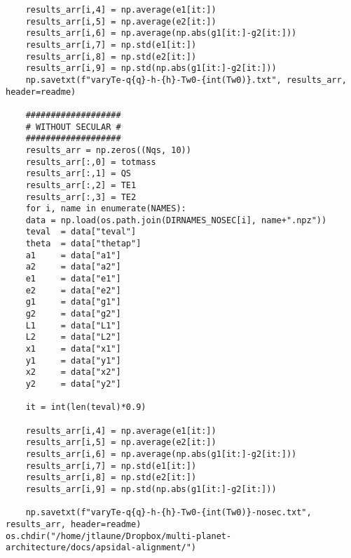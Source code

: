 \documentclass[11pt]{article}
\begin{document}
\begin{verbatim}
	results_arr[i,4] = np.average(e1[it:])
	results_arr[i,5] = np.average(e2[it:])
	results_arr[i,6] = np.average(np.abs(g1[it:]-g2[it:]))
	results_arr[i,7] = np.std(e1[it:])
	results_arr[i,8] = np.std(e2[it:])
	results_arr[i,9] = np.std(np.abs(g1[it:]-g2[it:]))
    np.savetxt(f"varyTe-q{q}-h-{h}-Tw0-{int(Tw0)}.txt", results_arr, header=readme)

    ###################
    # WITHOUT SECULAR #
    ###################
    results_arr = np.zeros((Nqs, 10))
    results_arr[:,0] = totmass
    results_arr[:,1] = QS
    results_arr[:,2] = TE1
    results_arr[:,3] = TE2
    for i, name in enumerate(NAMES):
	data = np.load(os.path.join(DIRNAMES_NOSEC[i], name+".npz"))
	teval  = data["teval"]
	theta  = data["thetap"]
	a1     = data["a1"]
	a2     = data["a2"]
	e1     = data["e1"]
	e2     = data["e2"]
	g1     = data["g1"]
	g2     = data["g2"]
	L1     = data["L1"]
	L2     = data["L2"]
	x1     = data["x1"]
	y1     = data["y1"]
	x2     = data["x2"]
	y2     = data["y2"]

	it = int(len(teval)*0.9)

	results_arr[i,4] = np.average(e1[it:])
	results_arr[i,5] = np.average(e2[it:])
	results_arr[i,6] = np.average(np.abs(g1[it:]-g2[it:]))
	results_arr[i,7] = np.std(e1[it:])
	results_arr[i,8] = np.std(e2[it:])
	results_arr[i,9] = np.std(np.abs(g1[it:]-g2[it:]))

    np.savetxt(f"varyTe-q{q}-h-{h}-Tw0-{int(Tw0)}-nosec.txt", results_arr, header=readme)
os.chdir("/home/jtlaune/Dropbox/multi-planet-architecture/docs/apsidal-alignment/")
\end{verbatim}
\end{document}
